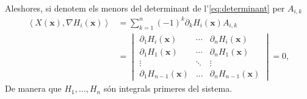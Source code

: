 \documentclass[12pt]{report}
\numberwithin{table}{section}
\numberwithin{equation}{section}
\numberwithin{figure}{section}
\renewcommand{\vec}[1]{\mathbf{#1}}
\newcommand{\inn}[2]{\left\langle #1 , #2 \right\rangle}
\begin{document}
Aleshores, si denotem els menors del determinant de l'\cref{eq:determinant} per \( A_{i,k} \)
\begin{align*}
	\inn{X(\vec{x})}{\nabla H_i(\vec{x})} & = \sum_{k = 1}^n (-1)^k \partial_k H_i(\vec{x}) A_{i,k} \\
																				& = \begin{vmatrix}
		\partial_1 H_i(\vec{x}) & \cdots & \partial_n H_i(\vec{x}) \\
		\partial_1 H_1(\vec{x}) & \cdots & \partial_n H_1(\vec{x}) \\
		\vdots & \ddots & \vdots \\ 
		\partial_1 H_{n-1}(\vec{x}) & \dots & \partial_n H_{n-1}(\vec{x}) 
	\end{vmatrix} = 0,
\end{align*}
De manera que \( H_1, \dots, H_n \) són integrals primeres del sistema.
\end{document}
